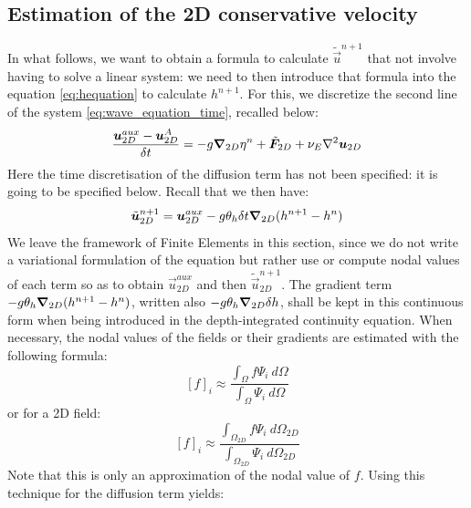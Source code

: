 \subsection{Estimation of the 2D conservative velocity}\label{momentumvariational}
In what follows, we want to obtain a formula to calculate $\tilde{\vec{u}}^{n+1}$ that
not involve having to solve a linear system: we need to then introduce
that formula into the equation \eqref{eq:hequation} to calculate $h^{n+1}$.
For this, we discretize the second line of the system \eqref{eq:wave_equation_time}, recalled below:
\begin{equation}
\dfrac{\vec{u}_{2D}^{aux}-\vec{u}_{2D}^{A}}{\delta t}= -g\Grad_{2D}\eta^n
     + \tilde{\vec{F}}_{2D}
     +\nu_E \Lap \vec{u}_{2D}\medskip\\
\end{equation}
Here the time discretisation of the diffusion term has not been specified: it is going to be specified below.
Recall that we then have:
\begin{equation}
 \tilde{\bm{u}}_{2D}^{n+1}=\bm{u}_{2D}^{aux}-g \theta_h \delta t\bm{\nabla}_{2D}(h^{n+1}-h^n)
\end{equation}
We leave the framework of Finite Elements in this section, since we do not
write a variational formulation of the equation but rather use or compute nodal
values of each term so as to obtain $\vec{u}_{2D}^{aux}$ and then $\tilde{\vec{u}}_{2D}^{n+1}$.
The gradient term $-g\theta_{h}\bm{\nabla}_{2D}(h^{n+1}-h^{n})$,
written also $-g\theta_{h}\bm{\nabla}_{2D}\delta h$, shall be kept
in this continuous form when being introduced in the depth-integrated continuity equation.
When necessary, the nodal values of the fields or their gradients are estimated
with the following formula:
\begin{equation}
\left[f\right]_i\approx\dfrac{\displaystyle{\int_\Omega} f\Psi_i~d\Omega}{\displaystyle{\int_\Omega}\Psi_i~d\Omega}\label{eq:nodalvalue}
\end{equation}
or for a 2D field:
\begin{equation}
\left[f\right]_i\approx\dfrac{\displaystyle{\int_{\Omega_{2D}}}f\Psi_i~d\Omega_{2D}}{\displaystyle{\int_{\Omega_{2D}}}\Psi_i~d\Omega_{2D}}\label{eq:nodalvalue2D}
\end{equation}
Note that this is only an approximation of the nodal value of $f$.
Using this technique for the diffusion term yields:
